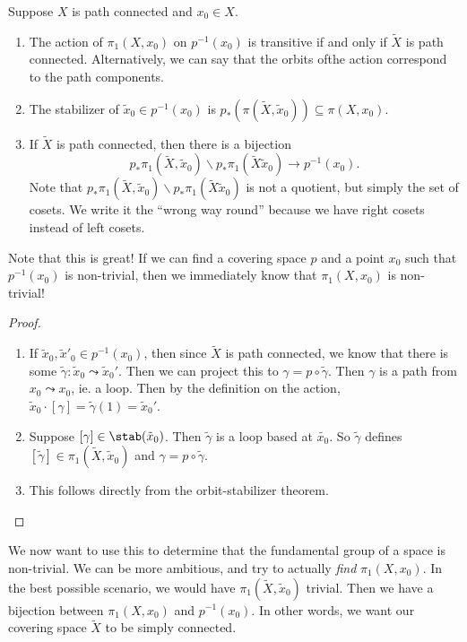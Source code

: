 \documentclass[a4paper]{article}
\begin{document}
\begin{lemma}
  Suppose $X$ is path connected and $x_0 \in X$.
  \begin{enumerate}
    \item The action of $\pi_1(X, x_0)$ on $p^{-1}(x_0)$ is transitive if and only if $\tilde{X}$ is path connected. Alternatively, we can say that the orbits ofthe action correspond to the path components.
    \item The stabilizer of $\tilde{x}_0 \in p^{-1}(x_0)$ is $p_*(\pi(\tilde{X}, \tilde{x}_0)) \subseteq \pi(X, x_0)$.
    \item If $\tilde{X}$ is path connected, then there is a bijection
      \[
        p_* \pi_1(\tilde{X}, \tilde{x}_0)\backslash p_* \pi_1(\tilde{X}\tilde{x}_0) \to p^{-1}(x_0).
      \]
      Note that $p_* \pi_1(\tilde{X}, \tilde{x}_0)\backslash p_* \pi_1(\tilde{X}\tilde{x}_0)$ is not a quotient, but simply the set of cosets. We write it the ``wrong way round'' because we have right cosets instead of left cosets.
  \end{enumerate}
\end{lemma}
Note that this is great! If we can find a covering space $p$ and a point $x_0$ such that $p^{-1}(x_0)$ is non-trivial, then we immediately know that $\pi_1(X, x_0)$ is non-trivial!

\begin{proof}\leavevmode
  \begin{enumerate}
    \item If $\tilde{x}_0, \tilde{x}'_0 \in p^{-1}(x_0)$, then since $\tilde{X}$ is path connected, we know that there is some $\tilde{\gamma}: \tilde{x}_0 \leadsto \tilde{x}_0'$. Then we can project this to $\gamma = p\circ \tilde{\gamma}$. Then $\gamma$ is a path from $x_0 \leadsto x_0$, ie. a loop. Then by the definition on the action, $\tilde{x}_0 \cdot [\gamma] = \tilde{\gamma}(1) = \tilde{x}_0'$.

    \item Suppose $[\gamma] \in \stab(\tilde{x}_0)$. Then $\tilde{\gamma}$ is a loop based at $\tilde{x_0}$. So $\tilde{\gamma}$ defines $[\tilde{\gamma}] \in \pi_1(\tilde{X}, \tilde{x}_0)$ and $\gamma = p\circ \tilde{\gamma}$.

    \item This follows directly from the orbit-stabilizer theorem.
  \end{enumerate}
\end{proof}

We now want to use this to determine that the fundamental group of a space is non-trivial. We can be more ambitious, and try to actually \emph{find} $\pi_1(X, x_0)$. In the best possible scenario, we would have $\pi_1(\tilde{X}, \tilde{x}_0)$ trivial. Then we have a bijection between $\pi_1(X, x_0)$ and $p^{-1}(x_0)$. In other words, we want our covering space $\tilde{X}$ to be simply connected.
\end{document}
